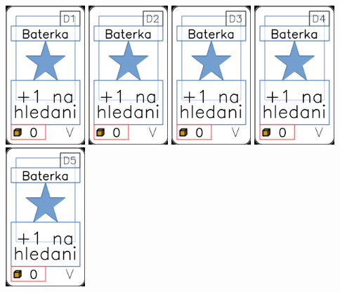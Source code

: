 \documentclass[a4paper]{article}
\begin{document}
	\includegraphics[width=3.0cm]{img-1_75}
	\includegraphics[width=3.0cm]{img-1_76}
	\includegraphics[width=3.0cm]{img-1_77}
	\includegraphics[width=3.0cm]{img-1_78}
	\includegraphics[width=3.0cm]{img-1_79}
\end{document}
